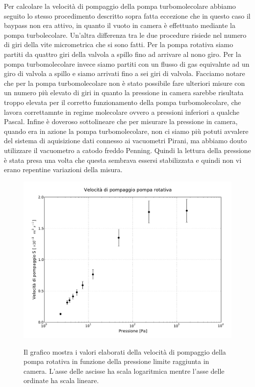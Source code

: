 Per calcolare la velocità di pompaggio della pompa turbomolecolare abbiamo seguito lo stesso procedimento descritto sopra fatta eccezione che in questo caso il baypass non era attivo, in quanto il vuoto in camera è effettuato mediante la pompa turbolecolare.
Un'altra differenza tra le due procedure risiede nel numero di giri della vite micrometrica che si sono fatti. Per la pompa rotativa siamo partiti da quattro giri della valvola a spillo fino ad arrivare al nono giro. Per la pompa turbomolecolare invece siamo partiti con un flusso di gas equivalnte ad un giro di valvola a spillo e siamo arrivati fino a sei giri di valvola. Facciamo notare che per la pompa turbomolecolare non è stato possibile fare ulteriori misure con un numero più elevato di giri in quanto la pressione in camera sarebbe risultata troppo elevata per il corretto funzionamento della pompa turbomolecolare, che lavora correttamnte in regime molecolare ovvero a pressioni inferiori a qualche Pascal.
Infine è doveroso sottolineare che per misurare la pressione in camera, quando era in azione la pompa turbomolecolare, non ci siamo più potuti avvalere del sistema di aquisizione dati connesso ai vacuometri Pirani, ma abbiamo douto utilizzare il vacuometro a catodo freddo Penning. Quindi la lettura della pressione è stata presa una volta che questa sembrava essersi stabilizzata e quindi non vi erano repentine variazioni della misura.  

\begin{figure}[b!]
	\centering
		\includegraphics[width = 15cm]{rotativa.pdf}
		\label{fig:rotativa}
	\caption{Il grafico mostra i valori elaborati della velocità di pompaggio della pompa rotativa in funzione della pressione limite raggiunta in camera. L'asse delle ascisse ha scala logaritmica mentre l'asse delle ordinate ha scala lineare.}
\end{figure}


